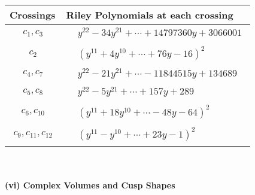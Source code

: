 \documentclass[1p]{elsarticle_modified}
\theoremstyle{definition}
\begin{document}
\begin{tabular}{m{50pt}|m{274pt}}
Crossings & \hspace{64pt}Riley Polynomials at each crossing \\
\hline $$\begin{aligned}c_{1},c_{3}\end{aligned}$$&$\begin{aligned}
&y^{22}-34 y^{21}+\cdots+14797360 y+3066001
\end{aligned}$\\
\hline $$\begin{aligned}c_{2}\end{aligned}$$&$\begin{aligned}
&(y^{11}+4 y^{10}+\cdots+76 y-16)^{2}
\end{aligned}$\\
\hline $$\begin{aligned}c_{4},c_{7}\end{aligned}$$&$\begin{aligned}
&y^{22}-21 y^{21}+\cdots-11844515 y+134689
\end{aligned}$\\
\hline $$\begin{aligned}c_{5},c_{8}\end{aligned}$$&$\begin{aligned}
&y^{22}-5 y^{21}+\cdots+157 y+289
\end{aligned}$\\
\hline $$\begin{aligned}c_{6},c_{10}\end{aligned}$$&$\begin{aligned}
&(y^{11}+18 y^{10}+\cdots-48 y-64)^{2}
\end{aligned}$\\
\hline $$\begin{aligned}c_{9},c_{11},c_{12}\end{aligned}$$&$\begin{aligned}
&(y^{11}- y^{10}+\cdots+23 y-1)^{2}
\end{aligned}$\\
\hline
\end{tabular}\\~\\
\newpage\flushleft \textbf{(vi) Complex Volumes and Cusp Shapes}
\end{document}
